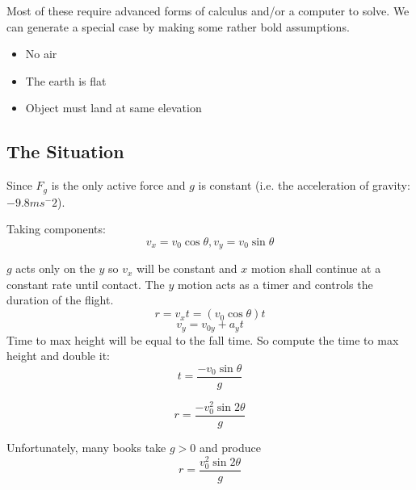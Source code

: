 \documentclass[letterpaper]{article}
\begin{document}
Most of these require advanced forms of calculus and/or a computer to solve.
We can generate a special case by making some rather bold assumptions.
\begin{itemize}
    \item No air
    \item The earth is flat
    \item Object must land at same elevation
\end{itemize}
\subsection{The Situation}
Since $F_g$ is the only active force and $g$ is constant (i.e. the
acceleration of gravity: $-9.8ms^-2$).

Taking components:
\[
    v_x = v_0 \cos{\theta}, v_y = v_0 \sin{\theta}
\]

$g$ acts only on the $y$ so $v_x$ will be constant and $x$ motion shall
continue at a constant rate until contact. The $y$ motion acts as a timer
and controls the duration of the flight.
\[
    r = v_x t = (v_0 \cos{\theta})t
\]
\[
    v_y = v_{0y} + a_y t
\]
Time to max height will be equal to the fall time. So compute the time to 
max height and double it:
\[
    t = \frac{-v_0 \sin{\theta}}{g}
\]

\[
    r = \frac{-v_0^2 \sin{2\theta}}{g}
\]

Unfortunately, many books take $g>0$ and produce
\begin{equation} \label{RangeEqn}
    r = \frac{v_0^2 \sin{2\theta}}{g}
\end{equation}
\end{document}
